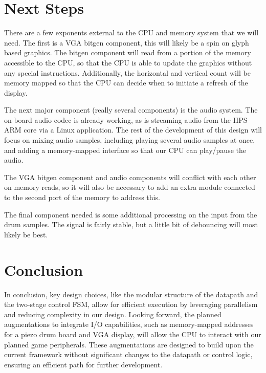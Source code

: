 \documentclass[10pt, portrait, letterpaper]{article}
\begin{document}
  \section{Next Steps} 
  There are a few exponents external to the CPU and memory system that we will need. 
  The first is a VGA bitgen component, this will likely be a spin on glyph based graphics. 
  The bitgen component will read from a portion of the memory accessible to the CPU, so that the 
  CPU is able to update the graphics without any special instructions. 
  Additionally, the horizontal and vertical count will be memory mapped so that the CPU can decide when to 
  initiate a refresh of the display.

  The next major component (really several components) is the audio system. 
  The on-board audio codec is already working, as is streaming audio from the HPS ARM core via a Linux application. 
  The rest of the development of this design will focus on mixing audio samples, including playing several 
  audio samples at once, and adding a memory-mapped interface so that our CPU can play/pause the audio.
  
  The VGA bitgen component and audio components will conflict with each other on memory reads, so it will also be necessary 
  to add an extra module connected to the second port of the memory to address this.

  The final component needed is some additional processing on the input from the drum samples. 
  The signal is fairly stable, but a little bit of debouncing will most likely be best.


  \section{Conclusion}
  In conclusion, key design choices, like the modular structure of the datapath and the two-stage control FSM, 
  allow for efficient execution by leveraging parallelism and reducing complexity in our design. 
  Looking forward, the planned augmentations to integrate I/O capabilities, 
  such as memory-mapped addresses for a piezo drum board and VGA display, 
  will allow the CPU to interact with our planned game peripherals. 
  These augmentations are designed to build upon the current framework 
  without significant changes to the datapath or control logic, ensuring an efficient path for further development.
\end{document}
